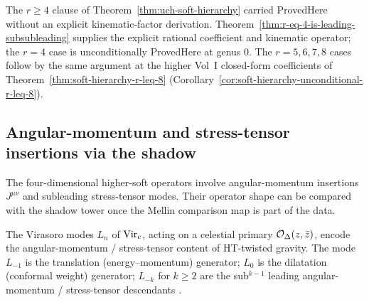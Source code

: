 \begin{remark}[Scope at $r = 4$]
\label{rem:smsb-r-eq-4-scope-upgrade}
The $r \geq 4$ clause of Theorem~\ref{thm:uch-soft-hierarchy} carried
ProvedHere without an explicit kinematic-factor
derivation. Theorem~\ref{thm:r-eq-4-is-leading-subsubleading} supplies
the explicit rational coefficient and kinematic operator; the $r = 4$
case is unconditionally ProvedHere at genus $0$. The $r = 5, 6, 7, 8$
cases follow by the same argument at the higher Vol~I closed-form
coefficients of Theorem~\ref{thm:soft-hierarchy-r-leq-8}
(Corollary~\ref{cor:soft-hierarchy-unconditional-r-leq-8}).
\end{remark}

\subsection{Angular-momentum and stress-tensor insertions via the shadow}
\label{subsec:smsb-angular-stress}

The four-dimensional higher-soft operators involve angular-momentum
insertions $J^{\mu \nu}$ and subleading stress-tensor modes. Their
operator shape can be compared with the shadow tower once the Mellin
comparison map is part of the data.

\begin{definition}
\label{def:smsb-angular-stress-modes}
\ClaimStatusProvedElsewhere
The Virasoro modes $L_n$ of $\mathrm{Vir}_c$, acting on a celestial primary
$\mathcal O_\Delta(z, \bar z)$, encode the angular-momentum / stress-tensor
content of HT-twisted gravity. The mode $L_{-1}$ is the translation
(energy--momentum) generator; $L_0$ is the dilatation (conformal
weight) generator; $L_{-k}$ for $k \geq 2$ are the sub${}^{k - 1}$
leading angular-momentum / stress-tensor descendants
\cite{DonnayPuhmStrominger18,StromingerLectures2018}.
\end{definition}

